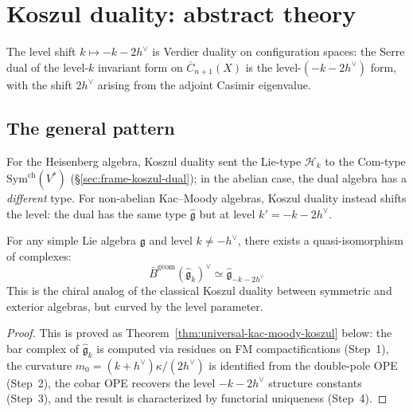 \section{Koszul duality: abstract theory}
\label{sec:km-koszul-abstract}

The level shift $k \mapsto -k - 2h^\vee$ is Verdier duality on configuration spaces: the Serre dual of the level-$k$ invariant form on $\overline{C}_{n+1}(X)$ is the level-$(-k-2h^\vee)$ form, with the shift $2h^\vee$ arising from the adjoint Casimir eigenvalue.

\subsection{The general pattern}

\begin{theorem}\label{thm:level-shifting-abstract}
For the Heisenberg algebra, Koszul duality sent the Lie-type $\mathcal{H}_k$ to the Com-type $\mathrm{Sym}^{\mathrm{ch}}(V^*)$ (\S\ref{sec:frame-koszul-dual}); in the abelian case, the dual algebra has a \emph{different} type.  For non-abelian Kac--Moody algebras, Koszul duality instead shifts the level: the dual has the same type $\widehat{\mathfrak{g}}$ but at level $k' = -k - 2h^\vee$.

For any simple Lie algebra $\mathfrak{g}$ and level $k \neq -h^\vee$, there exists a quasi-isomorphism of complexes:
\begin{equation}
\bar{B}^{\mathrm{geom}}(\widehat{\mathfrak{g}}_k)^\vee \simeq \widehat{\mathfrak{g}}_{-k-2h^\vee}
\end{equation}
This is the chiral analog of the classical Koszul duality between symmetric and exterior algebras, but curved by the level parameter.
\end{theorem}

\begin{proof}
This is proved as Theorem~\ref{thm:universal-kac-moody-koszul} below: the bar complex of $\widehat{\mathfrak{g}}_k$ is computed via residues on FM compactifications (Step~1), the curvature $m_0 = (k+h^\vee)\kappa/(2h^\vee)$ is identified from the double-pole OPE (Step~2), the cobar OPE recovers the level $-k - 2h^\vee$ structure constants (Step~3), and the result is characterized by functorial uniqueness (Step~4).
\end{proof}

